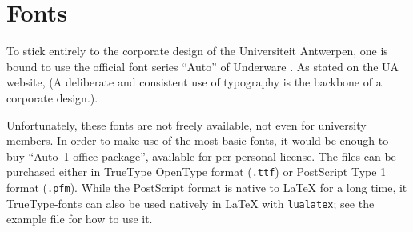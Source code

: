 \section{Fonts}

To stick entirely to the corporate design of the Universiteit Antwerpen, one is bound to use the official font series \enquote{Auto} of Underware \cite{Underware::ATI}. As stated on the UA website,  (A deliberate and consistent use of typography is the backbone of a corporate design.). 

Unfortunately, these fonts are not freely available, not even for university members. In order to make use of the most basic fonts, it would be enough to buy \enquote{Auto~1 office package}, available for  per personal license. The files can be purchased either in TrueType OpenType format (\lstinline!.ttf!) or PostScript Type 1 format (\lstinline!.pfm!). While the PostScript format is native to \LaTeX{} for a long time, it TrueType-fonts can also be used natively in \LaTeX{} with \lstinline!lualatex!; see the example file for how to use it.

